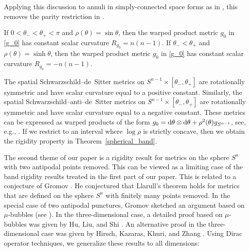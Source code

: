 \documentclass[pdftex]{sigma}
\numberwithin{equation}{section}
\begin{document}
Applying this discussion to annuli in simply-connected space forms as in \cite[Section~10]{Cecchini-Zeidler}, this removes the parity restriction in \cite[Corollaries~10.4 and~10.5]{Cecchini-Zeidler}.

\begin{Example}
If $0 < \theta_- < \theta_+ < \pi$ and $\rho(\theta) = \sin \theta$, then the warped product metric $g_0$ in \eqref{g_0} has constant scalar curvature $R_{g_0} = n(n-1)$. If $\theta_- < \theta_+$ and $\rho(\theta) = \sinh \theta$, then the warped product metric $g_0$ in \eqref{g_0} has constant scalar curvature $R_{g_0} = -n(n-1)$.
\end{Example}

\begin{Example}
The spatial Schwarzschild--de~Sitter metrics on $S^{n-1} \times [\theta_-, \theta_+]$ are rotationally symmetric and have scalar curvature equal to a positive constant.
Similarly, the spatial Schwarzschild--anti--de~Sitter metrics on $S^{n-1} \times [\theta_-, \theta_+]$ are rotationally symmetric and have scalar curvature equal to a negative constant.
These metrics can be expressed as warped products of the form $g_0 = {\rm d}\theta \otimes {\rm d}\theta + \rho^2(\theta) g_{S^{n-1}}$, see, e.g., \cite[p.~64]{Lee}.
If we restrict to an interval where $\log \rho$ is strictly concave, then we obtain the rigidity property in Theorem~\ref{spherical_band}.
\end{Example}


The second theme of our paper is a rigidity result for metrics on the sphere $S^n$ with two antipodal points removed.
This can be viewed as a limiting case of the band rigidity results treated in the first part of our paper.
This is related to a conjecture of Gromov \cite{Gromov}.
He conjectured that Llarull's theorem holds for metrics that are defined on the sphere $S^n$ with finitely many points removed.
In the special case of two antipodal punctures, Gromov sketched an argument based on $\mu$-bubbles (see \cite[Sections 5.5 and 5.7]{Gromov}).
In the three-dimensional case, a detailed proof based on $\mu$-bubbles was given by Hu, Liu, and Shi \cite{Hu-Liu-Shi}.
An alternative proof in the three-dimensional case was given by Hirsch, Kazaras, Khuri, and Zhang \cite{Hirsch-Kazaras-Khuri-Zhang}.
Using Dirac operator techniques, we generalize these results to all dimensions:
\end{document}
